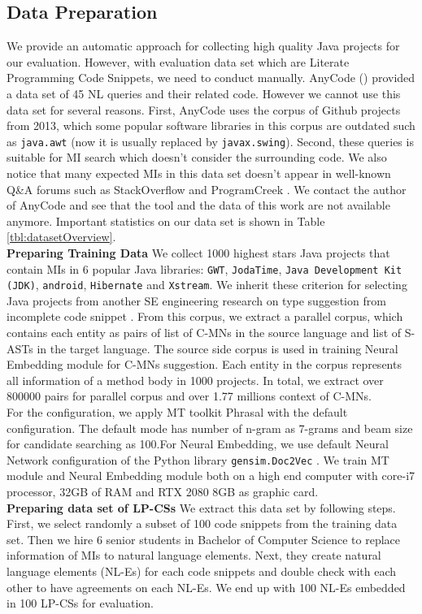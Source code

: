 \documentclass[sigconf,review,anonymous]{article}
\begin{document}
\subsection{Data Preparation}
We provide an automatic approach for collecting high quality Java projects for our evaluation. However, with evaluation data set which are Literate Programming Code Snippets, we need to conduct manually. AnyCode (\cite{007}) provided a data set of 45 NL queries and their related code. However we cannot use this data set for several reasons. First, AnyCode uses the corpus of Github projects from 2013, which some popular software libraries in this corpus are outdated such as \texttt{java.awt} (now it is usually replaced by \texttt{javax.swing}). Second, these queries is suitable for MI search which doesn't consider the surrounding code. We also notice that many expected MIs in this data set doesn't appear in well-known Q&A forums such as StackOverflow \cite{021} and ProgramCreek \cite{020}. We contact the author of AnyCode \cite{007} and see that the tool and the data of this work are not available anymore. Important statistics on our data set is shown in Table \ref{tbl:datasetOverview}.
\\

\textbf{Preparing Training Data} We collect 1000 highest stars Java projects that contain MIs in 6 popular Java libraries: \texttt{GWT}, \texttt{JodaTime}, \texttt{Java Development Kit (JDK)}, \texttt{android}, \texttt{Hibernate} and \texttt{Xstream}. We inherit these criterion for selecting Java projects from another SE engineering research on type suggestion from incomplete code snippet \cite{022}. From this corpus, we extract a parallel corpus, which contains each entity as pairs of list of C-MNs in the source language and list of S-ASTs in the target language. The source side corpus is used in training Neural Embedding module for C-MNs suggestion. Each entity in the corpus represents all information of a method body in 1000 projects. In total, we extract over 800000 pairs for parallel corpus and over 1.77 millions context of C-MNs.
\\
For the configuration, we apply MT toolkit Phrasal \cite{015} with the default configuration. The default mode has number of n-gram as 7-grams and beam size for candidate searching as 100.For Neural Embedding, we use default Neural Network configuration of the Python library \texttt{gensim.Doc2Vec} \cite{023}. We train MT module and Neural Embedding module both on a high end computer with core-i7 processor, 32GB of RAM and RTX 2080 8GB as graphic card.
\\
\textbf{Preparing data set of LP-CSs} We extract this data set by following steps. First, we select randomly a subset of 100 code snippets from the training data set. Then we hire 6 senior students in Bachelor of Computer Science to replace information of MIs to natural language elements. Next, they create natural language elements (NL-Es) for each code snippets and double check with each other to have agreements on each NL-Es. We end up with 100 NL-Es embedded in 100 LP-CSs for evaluation.  
\end{document}
